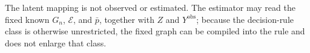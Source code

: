 The latent mapping is not observed or estimated. The estimator may read the fixed known \(G_n\), \(\mathcal E\), and \(\bar p\), together with \(Z\) and \(Y^{\mathrm{obs}}\); because the decision-rule class is otherwise unrestricted, the fixed graph can be compiled into the rule and does not enlarge that class.